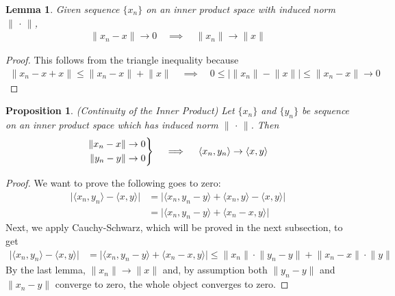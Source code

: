 \documentclass[12pt]{book}
\numberwithin{equation}{section} %
\theoremstyle{plain}
\newtheorem{lem}[thm]{Lemma}
\newtheorem{prop}[thm]{Proposition}
\theoremstyle{definition}
\theoremstyle{remark}
\newcommand{\ra}{\rightarrow}
\newenvironment{rcases}
  {\left.\begin{aligned}}
  {\end{aligned}\right\rbrace}
\begin{document}
\begin{lem}
Given sequence $\{x_n\}$ on an inner product space with induced norm
$\lVert\,\cdot\,\rVert$,
\begin{align*}
  \lVert x_n - x \rVert \ra 0
  \quad\implies\quad
  \lVert x_n \rVert \ra
  \lVert x \rVert
\end{align*}
\end{lem}
\begin{proof}
This follows from the triangle inequality because
\begin{align*}
  \lVert x_n - x + x\rVert
  \leq
  \lVert x_n - x\rVert + \lVert x\rVert
  \quad\implies\quad
  0 \leq
  \big\lvert
  \lVert x_n\rVert - \lVert x\rVert
  \big\rvert
  \leq
  \lVert x_n - x\rVert
  \ra 0
\end{align*}
\end{proof}

\begin{prop}\emph{(Continuity of the Inner Product)}
Let $\{x_n\}$ and $\{y_n\}$ be sequence on an inner product space which
has induced norm $\lVert\,\cdot\,\rVert$. Then
\begin{align*}
  \begin{rcases}
    \lVert x_n -x \rVert \ra 0 \\
    \lVert y_n -y \rVert \ra 0 \\
  \end{rcases}
  \quad\implies\quad
  \langle x_n, y_n\rangle
  \ra
  \langle x, y\rangle
\end{align*}
\end{prop}
\begin{proof}
We want to prove the following goes to zero:
\begin{align*}
  \big\lvert
  \langle x_n, y_n\rangle
  -
  \langle x, y\rangle
  \big\rvert
  &=
  \big\lvert
  \langle x_n, y_n-y\rangle
  + \langle x_n, y\rangle
  - \langle x, y\rangle
  \big\rvert
  \\
  &=
  \big\lvert
  \langle x_n, y_n-y\rangle
  + \langle x_n-x, y\rangle
  \big\rvert
\end{align*}
Next, we apply Cauchy-Schwarz, which will be proved in the next
subsection, to get
\begin{align*}
  \big\lvert
  \langle x_n, y_n\rangle
  -
  \langle x, y\rangle
  \big\rvert
  &=
  \big\lvert
  \langle x_n, y_n-y\rangle
  + \langle x_n-x, y\rangle
  \big\rvert
  \leq
  \lVert x_n \rVert
  \cdot
  \lVert y_n - y\rVert
  +
  \lVert x_n -x\rVert
  \cdot
  \lVert y\rVert
\end{align*}
By the last lemma, $\lVert x_n\rVert\ra \lVert x\rVert$ and, by
assumption both $\lVert y_n - y\rVert$ and $\lVert x_n - y\rVert$
converge to zero, the whole object converges to zero.
\end{proof}
\end{document}
